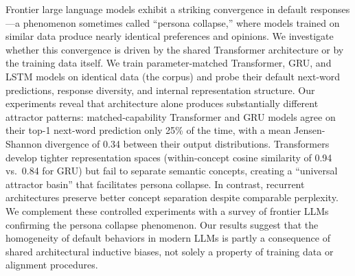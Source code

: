 Frontier large language models exhibit a striking convergence in default responses---a phenomenon sometimes called ``persona collapse,'' where models trained on similar data produce nearly identical preferences and opinions. We investigate whether this convergence is driven by the shared Transformer architecture or by the training data itself. We train parameter-matched Transformer, GRU, and LSTM models on identical data (the \tinystories corpus) and probe their default next-word predictions, response diversity, and internal representation structure. Our experiments reveal that architecture alone produces substantially different attractor patterns: matched-capability Transformer and GRU models agree on their top-1 next-word prediction only 25\% of the time, with a mean Jensen-Shannon divergence of 0.34 between their output distributions. Transformers develop tighter representation spaces (within-concept cosine similarity of 0.94 vs.\ 0.84 for GRU) but fail to separate semantic concepts, creating a ``universal attractor basin'' that facilitates persona collapse. In contrast, recurrent architectures preserve better concept separation despite comparable perplexity. We complement these controlled experiments with a survey of frontier LLMs confirming the persona collapse phenomenon. Our results suggest that the homogeneity of default behaviors in modern LLMs is partly a consequence of shared architectural inductive biases, not solely a property of training data or alignment procedures.
